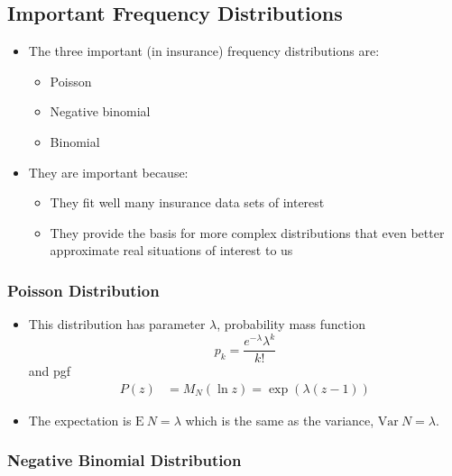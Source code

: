 \documentclass[]{book}
\theoremstyle{definition}
\theoremstyle{definition}
\theoremstyle{definition}
\theoremstyle{remark}
\begin{document}
\subsection{Important Frequency
Distributions}\label{important-frequency-distributions}

\begin{itemize}
\item
  The three important (in insurance) frequency distributions are:

  \begin{itemize}
  \item
    Poisson
  \item
    Negative binomial
  \item
    Binomial
  \end{itemize}
\item
  They are important because:

  \begin{itemize}
  \item
    They fit well many insurance data sets of interest
  \item
    They provide the basis for more complex distributions that even
    better approximate real situations of interest to us
  \end{itemize}
\end{itemize}

\subsubsection{Poisson Distribution}\label{poisson-distribution}

\begin{itemize}
\item
  This distribution has parameter \(\lambda\), probability mass function
  \[p_k = \frac{e^{-\lambda}\lambda^k}{k!}\] and pgf \[\begin{aligned}
  P(z) &= M_N (\ln z) = \exp(\lambda(z-1))\end{aligned}\]
\item
  The expectation is \(\mathrm{E~}N = \lambda\) which is the same as the
  variance, \(\mathrm{Var~}N = \lambda\).
\end{itemize}

\subsubsection{Negative Binomial
Distribution}\label{negative-binomial-distribution}
\end{document}
